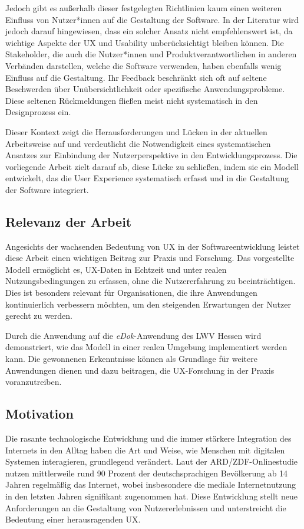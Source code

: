 \documentclass[12pt,oneside]{article}
\begin{document}
Jedoch gibt es außerhalb dieser festgelegten Richtlinien kaum einen weiteren Einfluss von Nutzer*innen auf die Gestaltung der Software. In der Literatur wird jedoch darauf hingewiesen, dass ein solcher Ansatz nicht empfehlenswert ist, da wichtige Aspekte der UX und Usability unberücksichtigt bleiben können. Die Stakeholder, die auch die Nutzer*innen und Produktverantwortlichen in anderen Verbänden darstellen, welche die Software verwenden, haben ebenfalls wenig Einfluss auf die Gestaltung. Ihr Feedback beschränkt sich oft auf seltene Beschwerden über Unübersichtlichkeit oder spezifische Anwendungsprobleme. Diese seltenen Rückmeldungen fließen meist nicht systematisch in den Designprozess ein.

Dieser Kontext zeigt die Herausforderungen und Lücken in der aktuellen Arbeitsweise auf und verdeutlicht die Notwendigkeit eines systematischen Ansatzes zur Einbindung der Nutzerperspektive in den Entwicklungsprozess. Die vorliegende Arbeit zielt darauf ab, diese Lücke zu schließen, indem sie ein Modell entwickelt, das die User Experience systematisch erfasst und in die Gestaltung der Software integriert.
\subsection{Relevanz der Arbeit}

Angesichts der wachsenden Bedeutung von UX in der Softwareentwicklung leistet diese Arbeit einen wichtigen Beitrag zur Praxis und Forschung. Das vorgestellte Modell ermöglicht es, UX-Daten in Echtzeit und unter realen Nutzungsbedingungen zu erfassen, ohne die Nutzererfahrung zu beeinträchtigen. Dies ist besonders relevant für Organisationen, die ihre Anwendungen kontinuierlich verbessern möchten, um den steigenden Erwartungen der Nutzer gerecht zu werden.

Durch die Anwendung auf die \textit{eDok}-Anwendung des LWV Hessen wird demonstriert, wie das Modell in einer realen Umgebung implementiert werden kann. Die gewonnenen Erkenntnisse können als Grundlage für weitere Anwendungen dienen und dazu beitragen, die UX-Forschung in der Praxis voranzutreiben.
\subsection{Motivation}

Die rasante technologische Entwicklung und die immer stärkere Integration des Internets in den Alltag haben die Art und Weise, wie Menschen mit digitalen Systemen interagieren, grundlegend verändert. Laut der ARD/ZDF-Onlinestudie \cite{ard} nutzen mittlerweile rund 90 Prozent der deutschsprachigen Bevölkerung ab 14 Jahren regelmäßig das Internet, wobei insbesondere die mediale Internetnutzung in den letzten Jahren signifikant zugenommen hat. Diese Entwicklung stellt neue Anforderungen an die Gestaltung von Nutzererlebnissen und unterstreicht die Bedeutung einer herausragenden UX.
\end{document}
